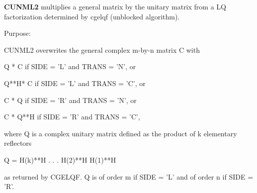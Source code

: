 {\bfseries C\+U\+N\+M\+L2} multiplies a general matrix by the unitary matrix from a L\+Q factorization determined by cgelqf (unblocked algorithm). 

 \begin{DoxyParagraph}{Purpose\+: }
\begin{DoxyVerb} CUNML2 overwrites the general complex m-by-n matrix C with

       Q * C  if SIDE = 'L' and TRANS = 'N', or

       Q**H* C  if SIDE = 'L' and TRANS = 'C', or

       C * Q  if SIDE = 'R' and TRANS = 'N', or

       C * Q**H if SIDE = 'R' and TRANS = 'C',

 where Q is a complex unitary matrix defined as the product of k
 elementary reflectors

       Q = H(k)**H . . . H(2)**H H(1)**H

 as returned by CGELQF. Q is of order m if SIDE = 'L' and of order n
 if SIDE = 'R'.\end{DoxyVerb}
 
\end{DoxyParagraph}

